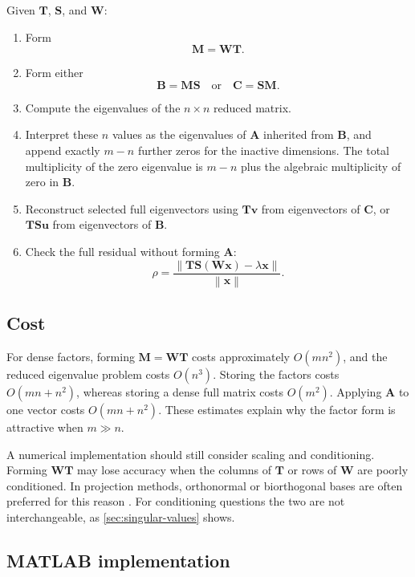 \documentclass[11pt]{article}
\newcommand{\mat}[1]{\mathbf{#1}}
\newcommand{\vect}[1]{\mathbf{#1}}
\newcommand{\norm}[1]{\left\lVert #1\right\rVert}
\theoremstyle{definition}
\theoremstyle{remark}
\begin{document}
Given \(\mat{T}\), \(\mat{S}\), and \(\mat{W}\):
\begin{enumerate}[label=\arabic*.]
  \item Form
  \[
    \mat{M}=\mat{W}\mat{T}.
  \]
  \item Form either
  \[
    \mat{B}=\mat{M}\mat{S}
    \quad\text{or}\quad
    \mat{C}=\mat{S}\mat{M}.
  \]
  \item Compute the eigenvalues of the \(n\times n\) reduced matrix.
  \item Interpret these \(n\) values as the eigenvalues of \(\mat{A}\) inherited from \(\mat{B}\), and append exactly \(m-n\) further zeros for the inactive dimensions. The total multiplicity of the zero eigenvalue is \(m-n\) plus the algebraic multiplicity of zero in \(\mat{B}\).
  \item Reconstruct selected full eigenvectors using \(\mat{T}\vect{v}\) from eigenvectors of \(\mat{C}\), or \(\mat{T}\mat{S}\vect{u}\) from eigenvectors of \(\mat{B}\).
  \item Check the full residual without forming \(\mat{A}\):
  \begin{equation}
    \rho
    =
    \frac{
      \norm{\mat{T}\mat{S}(\mat{W}\vect{x})-\lambda\vect{x}}
    }{
      \norm{\vect{x}}
    }.
    \label{eq:eigen-residual}
  \end{equation}
\end{enumerate}

\subsection{Cost}

For dense factors, forming \(\mat{M}=\mat{W}\mat{T}\) costs approximately \(O(mn^2)\), and the reduced eigenvalue problem costs \(O(n^3)\). Storing the factors costs \(O(mn+n^2)\), whereas storing a dense full matrix costs \(O(m^2)\). Applying \(\mat{A}\) to one vector costs \(O(mn+n^2)\). These estimates explain why the factor form is attractive when \(m\gg n\).

A numerical implementation should still consider scaling and conditioning. Forming \(\mat{W}\mat{T}\) may lose accuracy when the columns of \(\mat{T}\) or rows of \(\mat{W}\) are poorly conditioned. In projection methods, orthonormal or biorthogonal bases are often preferred for this reason \parencite{golub2013matrix,trefethen1997numerical}. For conditioning questions the two are not interchangeable, as \cref{sec:singular-values} shows.

\subsection{MATLAB implementation}
\end{document}
